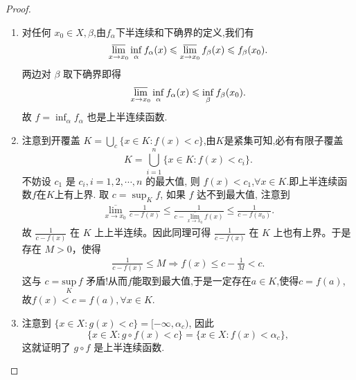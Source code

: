 \documentclass[../../main.tex]{subfiles}%
\begin{document}
\begin{proof}
\begin{enumerate}
\item 对任何 \(x_{0}\in X,\beta\),由$f_{\alpha}$下半连续和下确界的定义,我们有
\[
\varlimsup_{x \to x_{0}}\inf_{\alpha}f_{\alpha}(x)\leqslant \varlimsup_{x \to x_{0}}f_{\beta}(x)\leqslant  f_{\beta}(x_{0}).
\]
两边对 \(\beta\) 取下确界即得
\[
\varlimsup_{x \to x_{0}}\inf_{\alpha}f_{\alpha}(x)\leqslant \inf_{\beta}f_{\beta}(x_{0}).
\]
故 \(f = \inf_{\alpha}f_{\alpha}\) 也是上半连续函数.

\item 注意到开覆盖 \(K=\bigcup_{c}\{x\in K:f(x)<c\}\),由$K$是紧集可知,必有有限子覆盖
\[
K=\bigcup_{i = 1}^{n}\{x\in K:f(x)<c_{i}\}.
\]
不妨设 \(c_{1}\) 是 \(c_{i},i = 1,2,\cdots,n\) 的最大值, 则 \(f(x)<c_{1}\),\(\forall x\in K\).即上半连续函数$f$在$K$上有上界.  取 \(c=\sup_{K}f\), 如果 \(f\) 达不到最大值, 注意到
\begin{align*}
\underset{x\rightarrow x_0}{\overline{\lim }}\frac{1}{c-f(x)}\leqslant \frac{1}{c-\underset{x\rightarrow x_0}{\overline{\lim }}f(x)}\leqslant \frac{1}{c-f(x_0)}.
\end{align*}
故 $\frac{1}{c-f(x)}$ 在 $K$ 上上半连续。因此同理可得 $\frac{1}{c-f(x)}$ 在 $K$ 上也有上界。于是存在 $M>0$，使得
\begin{align*}
\frac{1}{c-f(x)}\leqslant M \Rightarrow f(x) \leqslant c-\frac{1}{M}<c.
\end{align*}
这与 $c=\underset{K}{\mathrm{sup}}\,f$ 矛盾!从而$f$能取到最大值,于是一定存在$a\in K$,使得$c=f(a)$,故$f(x)<c=f(a),\forall x\in K$.

\item 注意到 \(\{x\in X:g(x)<c\}=[-\infty,\alpha_{c})\), 因此
\[
\{x\in X:g\circ f(x)<c\}=\{x\in X:f(x)<\alpha_{c}\},
\]
这就证明了 \(g\circ f\) 是上半连续函数.
\end{enumerate}

\end{proof}
\end{document}
